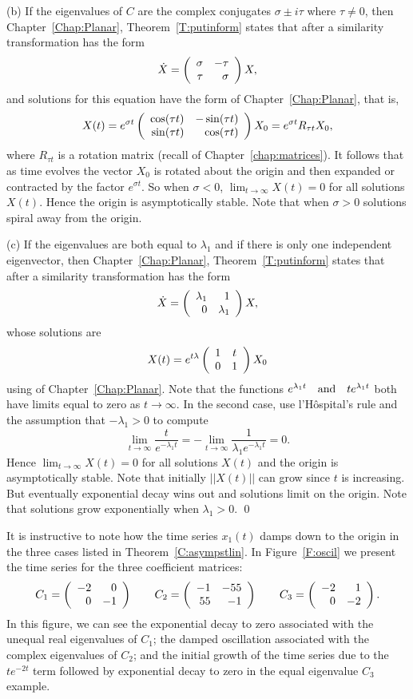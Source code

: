 \documentclass{ximera}
\begin{document}
\noindent (b) \quad If the eigenvalues of $C$ are the complex conjugates
$\sigma\pm i\tau$ where $\tau\neq 0$, then Chapter~\ref{Chap:Planar},
Theorem~\ref{T:putinform} states that after a similarity transformation
 has the form
\[
\dot{X} = \left(\begin{array}{rr} \sigma & -\tau\\ \tau &\sigma\end{array}\right)X,
\]
and solutions for this equation have the form  of
Chapter~\ref{Chap:Planar}, that is,
\[
X(t) = e^{\sigma t}
\left(\begin{array}{rr} \cos(\tau t) & -\sin(\tau t)\\ \sin(\tau t) &\cos(\tau t)\end{array}\right)X_0
= e^{\sigma t}R_{\tau t}X_0,
\]
where $R_{\tau t}$ is a rotation matrix
(recall  of
Chapter~\ref{chap:matrices}).  It follows that as time evolves
the vector $X_0$ is rotated about the origin and then expanded or contracted
by the factor $e^{\sigma t}$.  So when $\sigma<0$, $\lim_{t\to\infty} X(t)=0$
for all solutions $X(t)$.  Hence the origin is asymptotically stable.  Note
that when $\sigma>0$ solutions spiral away from the origin.

\noindent (c) \quad If the eigenvalues are both equal to $\lambda_1$
and if there is only one independent eigenvector, then
Chapter~\ref{Chap:Planar}, Theorem~\ref{T:putinform} states that after a
similarity transformation  has the form
\[
\dot{X} = \left(\begin{array}{rr} \lambda_1 & 1\\ 0 &\lambda_1\end{array}\right)X,
\]
whose solutions are
\[
X(t) = e^{t\lambda}\left(\begin{array}{cc} 1 & t\\ 0 &1\end{array}\right) X_0
\]
using  of Chapter~\ref{Chap:Planar}. Note that the functions
$e^{\lambda_1 t} \quad\mbox{and}\quad te^{\lambda_1 t}$ both have limits equal to zero as
$t\to\infty$.  In the second case, use l'H\^{o}spital's rule and the
assumption that $-\lambda_1>0$ to compute
\[
\lim_{t\to\infty} \frac{t}{e^{-\lambda_1 t}} =
  -\lim_{t\to\infty} \frac{1}{\lambda_1 e^{-\lambda_1 t}} = 0.
\]
Hence $\lim_{t\to\infty} X(t) =0$ for all solutions $X(t)$ and the origin
is asymptotically stable.  Note that initially $||X(t)||$ can grow since
$t$ is increasing.  But eventually exponential decay wins out and solutions
limit on the origin.   Note that solutions grow exponentially when
$\lambda_1>0$.  \qed

It is instructive to note how the time series $x_1(t)$ damps down to the
origin in the three cases listed in Theorem~\ref{C:asympstlin}.
In Figure~\ref{F:oscil} we present the time series for the three
coefficient matrices:
\[
C_1 = \left(\begin{array}{rr} -2 & 0\\ 0 &-1\end{array}\right) \qquad
C_2 = \left(\begin{array}{rr} -1 & -55\\ 55 &-1\end{array}\right) \qquad
C_3 = \left(\begin{array}{rr} -2 & 1\\ 0 &-2\end{array}\right).
\]
In this figure, we can see the exponential decay to zero associated with the
unequal real eigenvalues of $C_1$; the damped oscillation associated with the
complex eigenvalues of $C_2$; and the initial growth of the time series due
to the $te^{-2t}$ term followed by exponential decay to zero in the equal
eigenvalue $C_3$ example.
\end{document}
